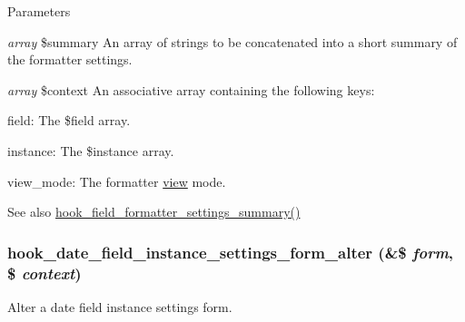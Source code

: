 \begin{DoxyParams}{Parameters}
\item[{\em array}]\$summary An array of strings to be concatenated into a short summary of the formatter settings. \item[{\em array}]\$context An associative array containing the following keys:
\begin{DoxyItemize}
\item field: The \$field array.
\item instance: The \$instance array.
\item view\_\-mode: The formatter \hyperlink{classview}{view} mode.
\end{DoxyItemize}\end{DoxyParams}
\begin{DoxySeeAlso}{See also}
\hyperlink{group__field__types_ga0cdef0fb8588dde07292df1b86f06d81}{hook\_\-field\_\-formatter\_\-settings\_\-summary()} 
\end{DoxySeeAlso}
\hypertarget{date_8api_8php_a4dcd88abb62128ef8e63f5d2163f46b3}{
\subsubsection[{hook\_\-date\_\-field\_\-instance\_\-settings\_\-form\_\-alter}]{\setlength{\rightskip}{0pt plus 5cm}hook\_\-date\_\-field\_\-instance\_\-settings\_\-form\_\-alter (\&\$ {\em form}, \/  \$ {\em context})}}
\label{date_8api_8php_a4dcd88abb62128ef8e63f5d2163f46b3}
Alter a date field instance settings form.


